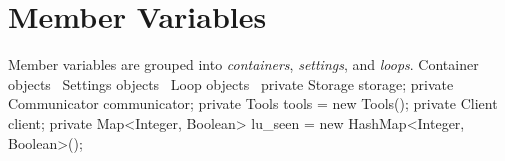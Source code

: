 \section{Member Variables}
Member variables are grouped into \emph{containers}, \emph{settings}, and
\emph{loops}.
\nwenddocs{}\plusendmoddef
\LA{}Container objects~{\nwtagstyle{}}\RA{}
\LA{}Settings objects~{\nwtagstyle{}}\RA{}
\LA{}Loop objects~{\nwtagstyle{}}\RA{}
\nwendcode{}\nwdocspar
{}
\nwenddocs{}\endmoddef{}
private Storage storage;
private Communicator communicator;
private Tools tools = new Tools();
private Client client;
private Map<Integer, Boolean> lu_seen = new HashMap<Integer, Boolean>();
\nwendcode{}\nwdocspar

